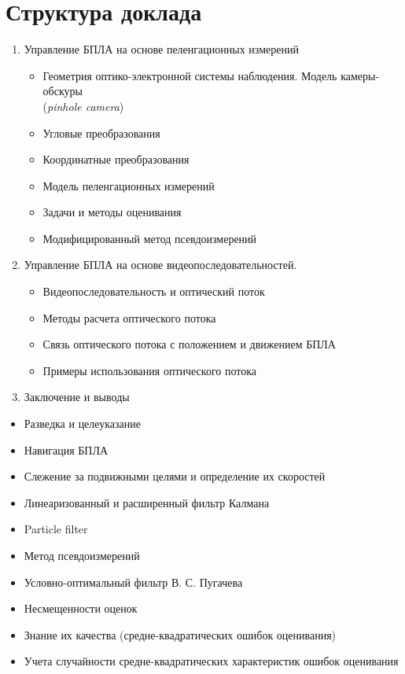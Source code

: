 \section*{Структура доклада}
\begin{enumerate}
\item
Управление БПЛА на основе пеленгационных измерений
\begin{itemize}
\item Геометрия оптико-электронной системы наблюдения. Модель камеры-обскуры\\ ({\it{pinhole camera}})
\item Угловые преобразования
\item Координатные преобразования
\item Модель пеленгационных измерений
\item Задачи и методы оценивания
\item Модифицированный метод псевдоизмерений
\end{itemize}
\item Управление БПЛА на основе видеопоследовательностей.
\begin{itemize}
\item Видеопоследовательность и оптический поток
\item Методы расчета оптического потока
\item Связь оптического потока с положением и движением БПЛА \item Примеры использования оптического потока
\end{itemize}
\item Заключение и выводы
\end{enumerate} 

\begin{itemize}\item Разведка и целеуказание
\item Навигация БПЛА
\item Слежение за подвижными целями и определение их скоростей
\end{itemize}

\begin{itemize}
\item Линеаризованный и расширенный фильтр Калмана
\item Particle filter
\item Метод псевдоизмерений
\item Условно-оптимальный фильтр В. С. Пугачева
\end{itemize}

\begin{itemize}
\item Несмещенности оценок
\item Знание их качества (средне-квадратических ошибок оценивания)
\item Учета случайности средне-квадратических характеристик ошибок оценивания
\end{itemize}





%


